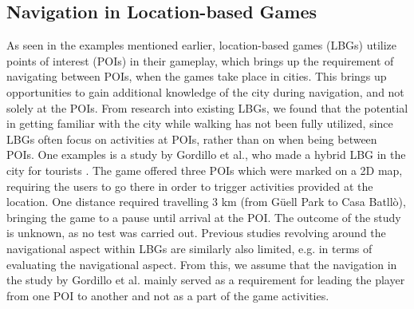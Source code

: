 \subsection{Navigation in Location-based Games}
As seen in the examples mentioned earlier, location-based games (LBGs) utilize points of interest (POIs) in their gameplay, which brings up the requirement of navigating between POIs, when the games take place in cities. This brings up opportunities to gain additional knowledge of the city during navigation, and not solely at the POIs. From research into existing LBGs, we found that the potential in getting familiar with the city while walking has not been fully utilized, since LBGs often focus on activities at POIs, rather than on when being between POIs. One examples is a study by Gordillo et al., who made a hybrid LBG in the city for tourists \cite{Learninggamified}. The game offered three POIs which were marked on a 2D map, requiring the users to go there in order to trigger activities provided at the location.  One distance required travelling 3 km (from G\"uell Park to Casa Batll\`{o}), bringing the game to a pause until arrival at the POI. The outcome of the study is unknown, as no test was carried out. Previous studies revolving around the navigational aspect within LBGs are similarly also limited, e.g. in terms of evaluating the navigational aspect. From this, we assume that the navigation in the study by  Gordillo et al. mainly served as a requirement for leading the player from one POI to another and not as a part of the game activities.


